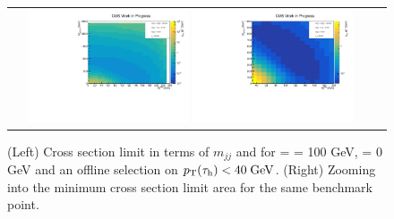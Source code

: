 \begin{figure}[tbh!]
	\centering
	\begin{tabular}{cc}
		\includegraphics[width=0.45\textwidth]{analysis/pics/JetInvMass_vs_MET_xsec_chi100_lsp000_taupt40.pdf}
		\includegraphics[width=0.45\textwidth]{analysis/pics/JetInvMass_vs_MET_xsec_chi100_lsp000_taupt40_zoom.pdf} 		
	\end{tabular}
	\caption{(Left) Cross section limit in terms of $m_{jj}$ and \met for \charginopm = \neutralinotwo = 100 GeV, \neutralinoone = 0 GeV and an offline selection on $p_{\text{T}}(\tau_{\text{h}}) <  40\;\text{Ge}\kern-0.06667em\text{V}$. (Right) Zooming into the minimum cross section limit area for the same benchmark point.}
	\label{fig::JetInvMass_vs_MET_xsec_chi100_lsp000_taupt40}
\end{figure}


